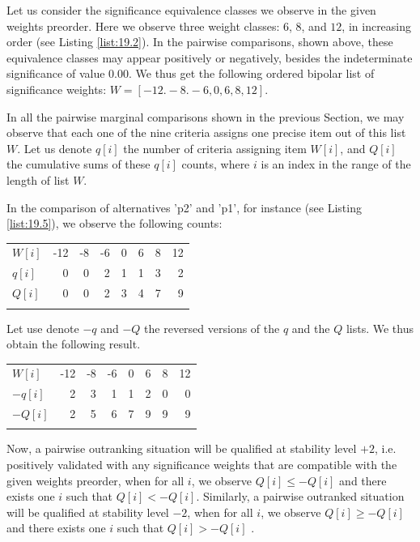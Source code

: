 Let us consider the significance equivalence classes we observe in the given weights preorder. Here we observe three weight classes: $6$, $8$, and $12$, in increasing order (see Listing \ref{list:19.2}). In the pairwise comparisons, shown above, these equivalence classes may appear positively or negatively, besides the indeterminate significance of value $0.00$. We thus get the following ordered bipolar list of significance weights: $W = [-12. -8. -6, 0, 6, 8, 12]$.

In all the pairwise marginal comparisons shown in the previous Section, we may observe that each one of the nine criteria assigns one precise item out of this list $W$. Let us denote $q[i]$ the number of criteria assigning item $W[i]$, and $Q[i]$ the cumulative sums of these $q[i]$ counts, where $i$ is an index in the range of the length of list $W$.

In the comparison of alternatives 'p2' and 'p1', for instance (see Listing \ref{list:19.5}), we observe the following counts: \hfill
\begin{center}
\begin{tabular}{l|r|r|r|r|r|r|r}
 \svhline\noalign{\smallskip}
  $W[i]$ & -12 & -8  & -6  &  0  &  6  &  8 &  12\\  
 \noalign{\smallskip}\hline\noalign{\smallskip}
$q[i]$  &  0 &  0 &   2 &   1  &  1  &  3  &  2 \\
$Q[i]$  &  0 &  0 &   2 &   3  &  4  &  7  &  9 \\
      \noalign{\smallskip}\hline
\end{tabular}
\end{center}

\noindent Let use denote $-q$ and $-Q$ the reversed versions of the $q$ and the $Q$ lists. We thus obtain the following result.\hfill
\begin{center}
\begin{tabular}{l|r|r|r|r|r|r|r}
 \svhline\noalign{\smallskip}
  $W[i]$ & -12 & -8  & -6  &  0  &  6  &  8 &  12\\  
 \noalign{\smallskip}\hline\noalign{\smallskip}
  $-q[i]$  &  2 &  3 &   1 &   1  &  2  &  0  &  0 \\
  $-Q[i]$  &  2 &  5 &   6 &   7  &  9  &  9  &  9 \\
 \noalign{\smallskip}\hline
\end{tabular}
\end{center}

Now, a pairwise outranking situation will be qualified at stability level $+2$, i.e. positively validated with any significance weights that are compatible with the given weights preorder, when for all $i$, we observe $Q[i] \leq -Q[i]$ and there exists one $i$ such that $Q[i] < -Q[i]$. Similarly, a pairwise outranked situation will be qualified at stability level $-2$, when for all $i$, we observe $Q[i] \geq -Q[i]$ and there exists one $i$ such that $Q[i] > -Q[i]$ \citep{BIS-2004c}.

